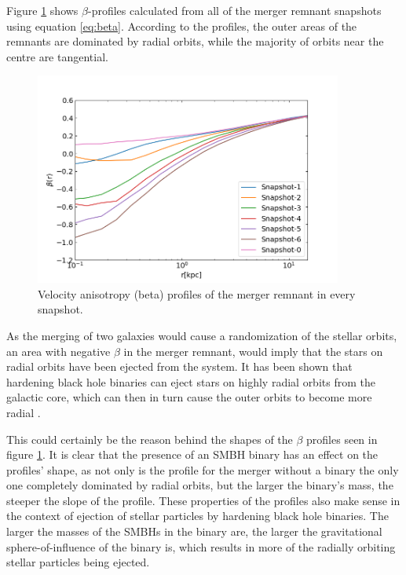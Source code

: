 \documentclass[english, oneside]{HYgradu}
\begin{document}
Figure \ref{figure:beta_no_rb} shows $\beta$-profiles calculated from all of the merger remnant snapshots using equation \ref{eq:beta}. According to the profiles, the outer areas of the remnants are dominated by radial orbits, while the majority of orbits near the centre are tangential.

\begin{figure}[h]
	\centering
	\includegraphics[width=0.9\textwidth]{beta_no_rb.png}
	\caption{Velocity anisotropy (beta) profiles of the merger remnant in every snapshot.}
	\label{figure:beta_no_rb}
\end{figure}


As the merging of two galaxies would cause a randomization of the stellar orbits, an area with negative $\beta$ in the merger remnant, would imply that the stars on radial orbits have been ejected from the system. It has been shown that hardening black hole binaries can eject stars on highly radial orbits from the galactic core, which can then in turn cause the outer orbits to become more radial \citep{Quinlan1997, Milosavljevic2001, Thomas2014}.

This could certainly be the reason behind the shapes of the $\beta$ profiles seen in figure \ref{figure:beta_no_rb}. It is clear that the presence of an SMBH binary has an effect on the profiles' shape, as not only is the profile for the merger without a binary the only one completely dominated by radial orbits, but the larger the binary's mass, the steeper the slope of the profile. These properties of the profiles also make sense in the context of ejection of stellar particles by hardening black hole binaries. The larger the masses of the SMBHs in the binary are, the larger the gravitational sphere-of-influence of the binary is, which results in more of the radially orbiting stellar particles being ejected.
\end{document}
